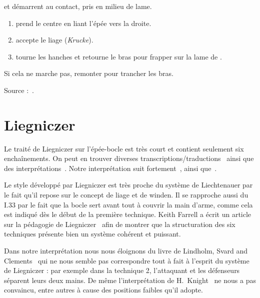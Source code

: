 \begin{technique}

\A et \D démarrent au contact, pris en milieu de lame.

\begin{enumerate}
	\item \A prend le centre en liant l'épée vers la droite.
	\item \D accepte le liage (\emph{Krucke}).
	\item \D tourne les hanches et retourne le bras pour frapper sur la lame de \A.
\end{enumerate}

Si cela ne marche pas, remonter pour trancher les bras.

Source :~\cite{fuhrmann:dijon:I33_liage:2015}.

\end{technique}



\section{Liegniczer}



Le traité de Liegniczer sur l'épée-bocle est très court et contient seulement six enchaînements.
On peut en trouver diverses transcriptions/traductions~\cite{ardamhe:liegniczer, farrell:liegnieczer, lindholm:ringeck_others:2006} ainsi que des interprétations~\cite{farrell:pedagogy_liegnieczer:2014, youtube:sala_armi:liegniczer, youtube:memag:liegniczer, lindholm:ringeck_others:2006, Myers:LiegniczerBuckler, knight:epee_bocle}.
Notre interprétation suit fortement~\cite{youtube:sala_armi:liegniczer, farrell:pedagogy_liegnieczer:2014}, ainsi que~\cite{youtube:memag:liegniczer}.

Le style développé par Liegniczer est très proche du système de Liechtenauer par le fait qu'il repose sur le concept de liage et de winden.
Il se rapproche aussi du I.33 par le fait que la bocle sert avant tout à couvrir la main d'arme, comme cela est indiqué dès le début de la première technique.
Keith Farrell a écrit un article sur la pédagogie de Liegniczer~\cite{farrell:pedagogy_liegnieczer:2014} afin de montrer que la structuration des six techniques présente bien un système cohérent et puissant.

Dans notre interprétation nous nous éloignons du livre de Lindholm, Svard and Clements~\cite{lindholm:ringeck_others:2006} qui ne nous semble pas correspondre tout à fait à l'esprit du système de Liegniczer : par exemple dans la technique 2, l'attaquant et les défenseurs séparent leurs deux mains.
De même l'interprétation de H.\ Knight~\cite[part I]{knight:epee_bocle} ne nous a pas convaincu, entre autres à cause des positions faibles qu'il adopte.

